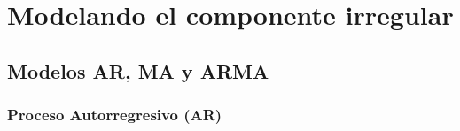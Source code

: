 \section{Modelando el componente irregular}

\subsection{Modelos AR, MA y ARMA}

\subsubsection{Proceso Autorregresivo (AR)}

